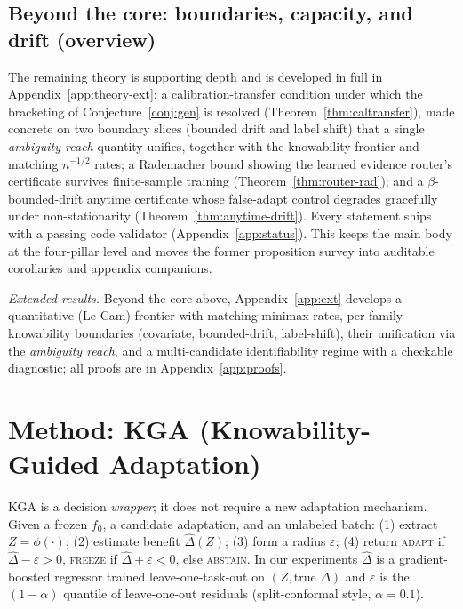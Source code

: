\documentclass[11pt]{article}
\theoremstyle{plain}
\theoremstyle{definition}
\begin{document}
\subsection{Beyond the core: boundaries, capacity, and drift (overview)}\label{sec:beyond}
The remaining theory is supporting depth and is developed in full in
Appendix~\ref{app:theory-ext}: a calibration-transfer condition under which the
bracketing of Conjecture~\ref{conj:gen} is resolved (Theorem~\ref{thm:caltransfer}),
made concrete on two boundary slices (bounded drift and label shift) that a single
\emph{ambiguity-reach} quantity unifies, together with the knowability frontier and
matching $n^{-1/2}$ rates; a Rademacher bound showing the learned evidence router's
certificate survives finite-sample training (Theorem~\ref{thm:router-rad}); and a
$\beta$-bounded-drift anytime certificate whose false-adapt control degrades gracefully
under non-stationarity (Theorem~\ref{thm:anytime-drift}). Every statement ships with a
passing code validator (Appendix~\ref{app:status}).
This keeps the main body at the four-pillar level and moves the former proposition survey into
auditable corollaries and appendix companions.

\noindent\emph{Extended results.} Beyond the core above, Appendix~\ref{app:ext} develops a quantitative (Le Cam) frontier with matching minimax rates, per-family knowability boundaries (covariate, bounded-drift, label-shift), their unification via the \emph{ambiguity reach}, and a multi-candidate identifiability regime with a checkable diagnostic; all proofs are in Appendix~\ref{app:proofs}.

\section{Method: \textsc{KGA} (Knowability-Guided Adaptation)}
\textsc{KGA} is a decision \emph{wrapper}; it does not require a new adaptation
mechanism. Given a frozen $f_0$, a candidate adaptation, and an unlabeled batch:
(1) extract $Z=\phi(\cdot)$; (2) estimate benefit $\widehat\Delta(Z)$; (3) form a
radius $\varepsilon$; (4) return \textsc{adapt} if $\widehat\Delta-\varepsilon>0$,
\textsc{freeze} if $\widehat\Delta+\varepsilon<0$, else \textsc{abstain}. In our
experiments $\widehat\Delta$ is a gradient-boosted regressor trained leave-one-task-out
on $(Z,\text{true }\Delta)$ and $\varepsilon$ is the $(1-\alpha)$ quantile of
leave-one-out residuals (split-conformal style, $\alpha=0.1$).
\end{document}
